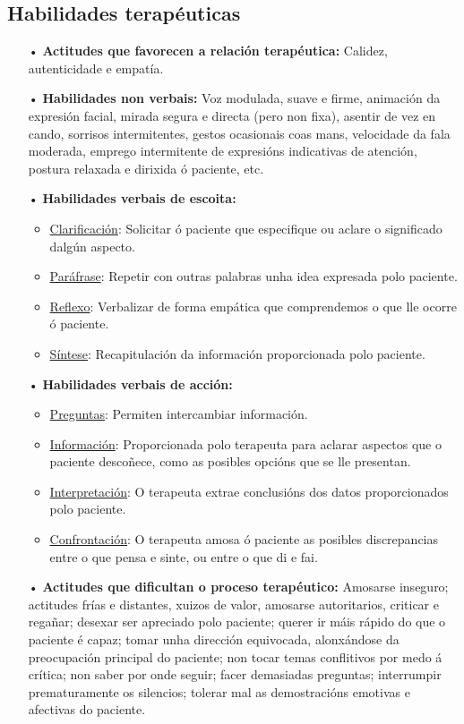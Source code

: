 \documentclass[a4paper,11pt]{article}
\begin{document}
\subsection{Habilidades terapéuticas}
\begin{itemize}
	\item[•] \textbf{Actitudes que favorecen a relación terapéutica:} Calidez, autenticidade e 
	empatía.
	\item[•] \textbf{Habilidades non verbais:} Voz modulada, suave e firme, animación da expresión 
	facial, mirada segura e directa (pero non fixa), asentir de vez en cando, sorrisos intermitentes, 
	gestos ocasionais coas mans, velocidade da fala moderada, emprego intermitente de expresións 
	indicativas de atención, postura relaxada e dirixida ó paciente, etc.
	\item[•] \textbf{Habilidades verbais de escoita:} 
	\begin{itemize}
		\item \underline{Clarificación}: Solicitar ó paciente que especifique ou aclare o significado 
		dalgún aspecto. 
		\item \underline{Paráfrase}: Repetir con outras palabras unha idea expresada polo paciente.
		\item \underline{Reflexo}: Verbalizar de forma empática que comprendemos o que lle ocorre ó 
		paciente.
		\item \underline{Síntese}: Recapitulación da información proporcionada polo paciente.
	\end{itemize}
	\item[•] \textbf{Habilidades verbais de acción:} 
	\begin{itemize}
		\item \underline{Preguntas}: Permiten intercambiar información.
		\item \underline{Información}: Proporcionada polo terapeuta para aclarar aspectos que o 
		paciente descoñece, como as posibles opcións que se lle presentan.
		\item \underline{Interpretación}: O terapeuta extrae conclusións dos datos proporcionados 
		polo paciente. 
		\item \underline{Confrontación}: O terapeuta amosa ó paciente as posibles discrepancias entre 
		o que pensa e sinte, ou entre o que di e fai. 
	\end{itemize}
	\item[•] \textbf{Actitudes que dificultan o proceso terapéutico:} Amosarse inseguro; actitudes 
	frías e distantes, xuizos de valor, amosarse autoritarios, criticar e regañar; desexar ser 
	apreciado polo paciente; querer ir máis rápido do que o paciente é capaz; tomar unha dirección 
	equivocada, alonxándose da preocupación principal do paciente; non tocar temas conflitivos por 
	medo á crítica; non saber por onde seguir; facer demasiadas preguntas; interrumpir prematuramente 
	os silencios; tolerar mal as demostracións emotivas e afectivas do paciente. 
\end{itemize}

\end{document}
